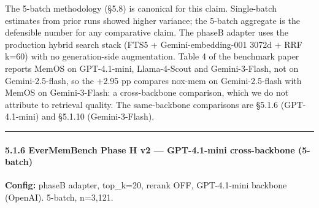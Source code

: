 \documentclass[
]{article}
\begin{document}
The 5-batch methodology (§5.8) is canonical for this claim. Single-batch
estimates from prior runs showed higher variance; the 5-batch aggregate
is the defensible number for any comparative claim. The phaseB adapter
uses the production hybrid search stack (FTS5 + Gemini-embedding-001
3072d + RRF k=60) with no generation-side augmentation. Table 4 of the
benchmark paper reports MemOS on GPT-4.1-mini, Llama-4-Scout and
Gemini-3-Flash, not on Gemini-2.5-flash, so the +2.95 pp compares
nox-mem on Gemini-2.5-flash with MemOS on Gemini-3-Flash: a
cross-backbone comparison, which we do not attribute to retrieval
quality. The same-backbone comparisons are §5.1.6 (GPT-4.1-mini) and
§5.1.10 (Gemini-3-Flash).

\begin{center}\rule{0.5\linewidth}{0.5pt}\end{center}

\paragraph{5.1.6 EverMemBench Phase H v2 --- GPT-4.1-mini cross-backbone
(5-batch)}\label{evermembench-phase-h-v2-gpt-4.1-mini-cross-backbone-5-batch}

\textbf{Config:} phaseB adapter, top\_k=20, rerank OFF, GPT-4.1-mini
backbone (OpenAI). 5-batch, n=3,121.
\end{document}
